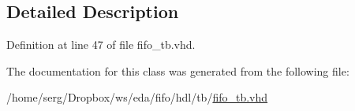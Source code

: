 \subsection{Detailed Description}


Definition at line 47 of file fifo\+\_\+tb.\+vhd.



The documentation for this class was generated from the following file\+:\begin{DoxyCompactItemize}
\item 
/home/serg/\+Dropbox/ws/eda/fifo/hdl/tb/\hyperlink{fifo__tb_8vhd}{fifo\+\_\+tb.\+vhd}\end{DoxyCompactItemize}
